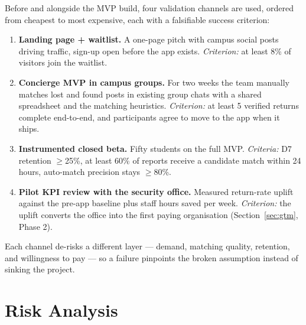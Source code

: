 \documentclass[11pt,a4paper]{article}
\begin{document}
Before and alongside the MVP build, four validation channels are used, ordered from
cheapest to most expensive, each with a falsifiable success criterion:

\begin{enumerate}
  \item \textbf{Landing page + waitlist.} A one-page pitch with campus social posts
        driving traffic, sign-up open before the app exists. \emph{Criterion:} at least
        8\% of visitors join the waitlist.
  \item \textbf{Concierge MVP in campus groups.} For two weeks the team manually matches
        lost and found posts in existing group chats with a shared spreadsheet and the
        matching heuristics. \emph{Criterion:} at least 5 verified returns complete
        end-to-end, and participants agree to move to the app when it ships.
  \item \textbf{Instrumented closed beta.} Fifty students on the full MVP.
        \emph{Criteria:} D7 retention $\geq$25\%, at least 60\% of reports receive a
        candidate match within 24 hours, auto-match precision stays $\geq$80\%.
  \item \textbf{Pilot KPI review with the security office.} Measured return-rate uplift
        against the pre-app baseline plus staff hours saved per week. \emph{Criterion:}
        the uplift converts the office into the first paying organisation
        (Section~\ref{sec:gtm}, Phase 2).
\end{enumerate}

Each channel de-risks a different layer --- demand, matching quality, retention, and
willingness to pay --- so a failure pinpoints the broken assumption instead of sinking
the project.

\section{Risk Analysis}
\end{document}
